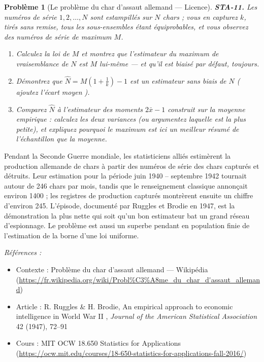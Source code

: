 \documentclass[11pt]{article}
\newtheorem{problem}{Problème}
\newenvironment{refs}{\par\small\noindent\emph{Références :}\begin{itemize}\setlength\itemsep{0pt}}{\end{itemize}\normalsize}
\begin{document}
\bigskip

\begin{problem}[{Le problème du char d'assaut allemand --- Licence}]
\textbf{STA-11.} Les numéros de série $ 1, 2, \dots, N $ sont estampillés sur $ N $ chars ;
vous en capturez $ k $, tirés sans remise, tous les sous-ensembles étant équiprobables, et vous
observez des numéros de série de maximum $ M $.
\begin{enumerate}
\item[(a)] Calculez la loi de $ M $ et montrez que l'estimateur du maximum de vraisemblance de $ N $
est $ M $ lui-même --- et qu'il est biaisé par défaut, toujours.
\item[(b)] Démontrez que $ \hat{N} = M\left(1 + \frac{1}{k}\right) - 1 $ est un estimateur sans biais de
$ N $ (\og{} ajoutez l'écart moyen \fg{}).
\item[(c)] Comparez $ \hat{N} $ à l'estimateur des moments $ 2\bar{x} - 1 $ construit sur la moyenne
empirique : calculez les deux variances (ou argumentez laquelle est la plus petite), et expliquez
pourquoi le maximum est ici un meilleur résumé de l'échantillon que la moyenne.
\end{enumerate}

\end{problem}

\noindent Pendant la Seconde Guerre mondiale, les statisticiens alliés estimèrent la
production allemande de chars à partir des numéros de série des chars capturés et détruits. Leur
estimation pour la période juin 1940 -- septembre 1942 tournait autour de 246 chars par mois, tandis
que le renseignement classique annonçait environ 1400 ; les registres de production capturés
montrèrent ensuite un chiffre d'environ 245. L'épisode, documenté par Ruggles et Brodie en 1947,
est la démonstration la plus nette qui soit qu'un bon estimateur bat un grand réseau d'espionnage.
Le problème est aussi un superbe pendant en population finie de l'estimation de la borne d'une loi
uniforme.

\begin{refs}
\item Contexte : Problème du char d'assaut allemand --- Wikipédia (\url{https://fr.wikipedia.org/wiki/Probl%C3%A8me_du_char_d'assaut_allemand})
\item Article : R. Ruggles \& H. Brodie, \og{} An empirical approach to economic intelligence in World War II \fg{}, \textit{Journal of the American Statistical Association} 42 (1947), 72--91
\item Cours : MIT OCW 18.650 Statistics for Applications (\url{https://ocw.mit.edu/courses/18-650-statistics-for-applications-fall-2016/})
\end{refs}
\end{document}
